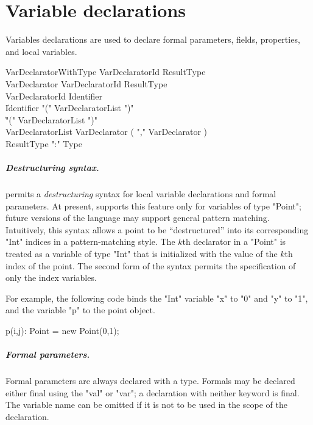 \chapter{Variable declarations}
\label{exploded-syntax}

Variables declarations are used to declare formal parameters,
fields, properties, and local variables.

\begin{grammar}
VarDeclaratorWithType \: VarDeclaratorId ResultType \\
VarDeclarator \: VarDeclaratorId ResultType\opt \\
VarDeclaratorId \: Identifier \\
              \| Identifier \xcd"(" VarDeclaratorList \xcd")" \\
              \| \xcd"(" VarDeclaratorList \xcd")" \\
VarDeclaratorList \: VarDeclarator ( \xcd"," VarDeclarator )\star \\
ResultType \: \xcd":" Type \\
\end{grammar}


\paragraph{Destructuring syntax.}
\Xten{} permits a \emph{destructuring} syntax for local variable
declarations and formal parameters.
At present, \XtenCurrVer{} supports this feature only for
variables of
type \xcd"Point"; future versions of the language may support 
general pattern matching.
Intuitively, this syntax allows a
point to be ``destructured'' into its corresponding \xcd"Int" 
indices in a pattern-matching style.
The $k$th declarator in a \xcd"Point"
is treated as a variable of type \xcd"Int"
that is initialized with the value of the $k$th index of the point. 
The second form of the syntax permits the specification of only
the index variables.

For example, the following code binds the \xcd"Int" variable \xcd"x" to
\xcd"0" and \xcd"y" to \xcd"1", and the variable \xcd"p" to the
point object.
\begin{xten}
p(i,j): Point = new Point(0,1);
\end{xten}

\paragraph{Formal parameters.}
Formal parameters are always declared with a type.
Formals may be declared either
final using the \xcd"val" or \xcd"var"; a declaration with
neither keyword is final.
The
variable name can be omitted if it is not to be used in the
scope of the declaration.


